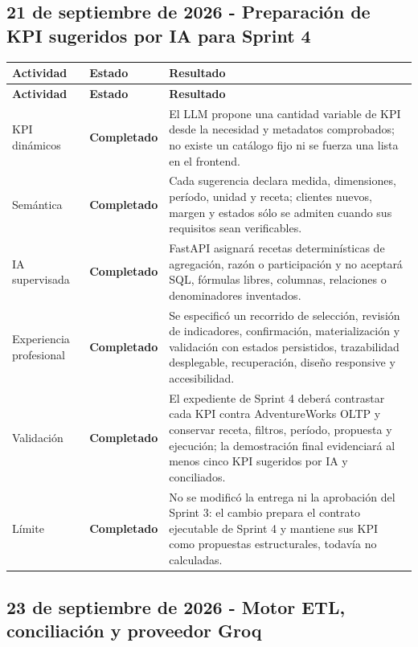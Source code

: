 \documentclass[11pt,letterpaper]{article}
\newcommand{\statusok}{\textcolor{deepgreen}{\textbf{Completado}}}
\begin{document}
\subsection{21 de septiembre de 2026 - Preparación de KPI sugeridos por IA para Sprint 4}

\begin{longtable}{@{}p{}p{}p{}@{}}
  \toprule
  \textbf{Actividad} & \textbf{Estado} & \textbf{Resultado} \\
  \midrule
  \endfirsthead
  \toprule
  \textbf{Actividad} & \textbf{Estado} & \textbf{Resultado} \\
  \midrule
  \endhead
  KPI dinámicos & \statusok & El LLM propone una cantidad variable de KPI desde la necesidad y metadatos comprobados; no existe un catálogo fijo ni se fuerza una lista en el frontend. \\
  Semántica & \statusok & Cada sugerencia declara medida, dimensiones, período, unidad y receta; clientes nuevos, margen y estados sólo se admiten cuando sus requisitos sean verificables. \\
  IA supervisada & \statusok & FastAPI asignará recetas determinísticas de agregación, razón o participación y no aceptará SQL, fórmulas libres, columnas, relaciones o denominadores inventados. \\
  Experiencia profesional & \statusok & Se especificó un recorrido de selección, revisión de indicadores, confirmación, materialización y validación con estados persistidos, trazabilidad desplegable, recuperación, diseño responsive y accesibilidad. \\
  Validación & \statusok & El expediente de Sprint 4 deberá contrastar cada KPI contra AdventureWorks OLTP y conservar receta, filtros, período, propuesta y ejecución; la demostración final evidenciará al menos cinco KPI sugeridos por IA y conciliados. \\
  Límite & \statusok & No se modificó la entrega ni la aprobación del Sprint 3: el cambio prepara el contrato ejecutable de Sprint 4 y mantiene sus KPI como propuestas estructurales, todavía no calculadas. \\
  \bottomrule
\end{longtable}

\subsection{23 de septiembre de 2026 - Motor ETL, conciliación y proveedor Groq}
\end{document}
